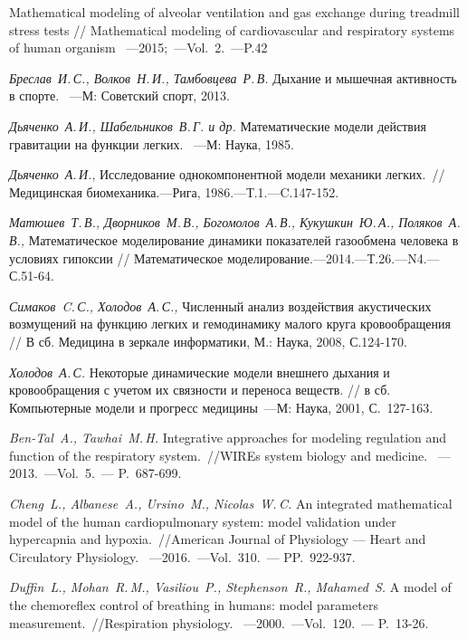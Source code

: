 \begin{thebibliography}{}
     Mathematical modeling of alveolar ventilation and gas exchange during treadmill stress tests // Mathematical modeling of cardiovascular and  respiratory systems of human organism ~---2015;~---Vol.~2.~---P.42

	{\it Бреслав~И.\,С., Волков~Н.\,И., Тамбовцева~Р.\,В.} Дыхание и мышечная активность в спорте. ~---М: Советский спорт, 2013.
			
	{\it Дьяченко~А.\,И., Шабельников~В.\,Г. и др.} Математические модели действия гравитации на функции легких. ~---М: Наука, 1985.
	
	 {\it Дьяченко~А.\,И.}, Исследование однокомпонентной модели механики легких.~// Медицинская биомеханика.---Рига, 1986.---Т.1.---C.147-152.
		
	 {\it Матюшев~Т.\,В., Дворников~М.\,В., Богомолов~А.\,В., Кукушкин~Ю.\,А., Поляков~А.\,В.,}  Математическое моделирование динамики показателей газообмена человека в условиях гипоксии // Математическое моделирование.---2014.---Т.26.---N4.---С.51-64.
		
	 {\it Симаков~C.\,С., Холодов~А.\,С.,}  Численный анализ воздействия акустических возмущений на функцию легких и гемодинамику малого круга кровообращения // В сб. Медицина в зеркале информатики, М.: Наука, 2008, С.124-170.
			
	{\it Холодов~А.\,С.} Некоторые динамические модели внешнего дыхания и кровообращения с учетом их связности и переноса веществ. // в сб. Компьютерные модели и прогресс медицины~---М: Наука, 2001, С.~127-163.
				
	 {\it Ben-Tal~A., Tawhai~M.\,H.} Integrative approaches for modeling regulation and function of the respiratory system.~//WIREs system biology and medicine. ~---2013.~---Vol.~5.~--- P.~687-699.
		
	 {\it Cheng~L., Albanese~A., Ursino~M., Nicolas~W.\,C.} An integrated mathematical model of the human cardiopulmonary system: model validation under hypercapnia and hypoxia.~//American Journal of Physiology --- Heart and Circulatory Physiology. ~---2016.~---Vol.~310.~--- PP.~922-937.

	 {\it Duffin~L., Mohan~R.\,M., Vasiliou~P., Stephenson~R., Mahamed~S.} A model of the chemoreflex control of breathing in humans: model parameters measurement.~//Respiration physiology. ~---2000.~---Vol.~120.~--- P.~13-26.


\end{thebibliography}
